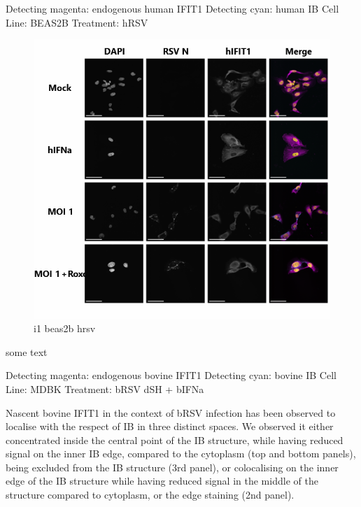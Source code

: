Detecting magenta: endogenous human IFIT1 \newline
Detecting cyan: human IB \newline
Cell Line: BEAS2B \newline
Treatment: hRSV \newline

\begin{figure}
    \centering
    \includegraphics[width=1\linewidth]{09. Chapter 4/Figs/03. IFIT1/05. beas2b hrsv.png}
    \caption[i1 beas2b hrsv]{i1 beas2b hrsv}
    \label{fig:i1 beas2b hrsv}
\end{figure}

 \label{bIFIT1 Localisation During h/bRSV Infection}
some text

Detecting magenta: endogenous bovine IFIT1 \newline
Detecting cyan: bovine IB \newline
Cell Line: MDBK \newline
Treatment: bRSV dSH + bIFNa \newline

Nascent bovine IFIT1 in the context of bRSV infection has been observed to localise with the respect of IB in three distinct spaces. We observed it either concentrated inside the central point of the IB structure, while having reduced signal on the inner IB edge, compared to the cytoplasm (top and bottom panels), being excluded from the IB structure (3rd panel), or colocalising on the inner edge of the IB structure while having reduced signal in the middle of the structure compared to cytoplasm, or the edge staining (2nd panel).

